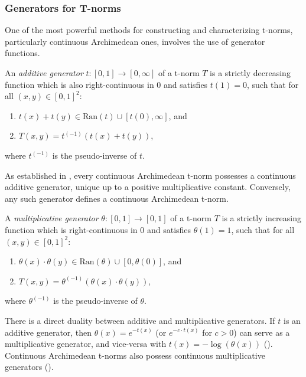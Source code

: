 \subsubsection{Generators for T-norms}

One of the most powerful methods for constructing and characterizing t-norms, particularly continuous Archimedean ones, involves the use of generator functions.

\begin{definition}
  An \emph{additive generator} $t: [0,1] \to [0,\infty]$ of a t-norm $T$ is a strictly decreasing function which is also right-continuous in $0$ and satisfies $t(1)=0$, such that for all $(x,y) \in [0,1]^2$:
  \begin{enumerate}
      \item $t(x) + t(y) \in \mathrm{Ran}(t) \cup [t(0), \infty]$, and
      \item $T(x,y) = t^{(-1)}(t(x) + t(y))$,
  \end{enumerate}
  where $t^{(-1)}$ is the pseudo-inverse of $t$.
\end{definition}

\begin{remark}
  As established in \cite[Theorem 5.1, p.~122]{Klement2000}, every continuous Archimedean t-norm possesses a continuous additive generator, unique up to a positive multiplicative constant. Conversely, any such generator defines a continuous Archimedean t-norm.
\end{remark}

\begin{definition}
  A \emph{multiplicative generator} $\theta: [0,1] \to [0,1]$ of a t-norm $T$ is a strictly increasing function which is right-continuous in $0$ and satisfies $\theta(1)=1$, such that for all $(x,y) \in [0,1]^2$:
  \begin{enumerate}
      \item $\theta(x) \cdot \theta(y) \in \mathrm{Ran}(\theta) \cup [0, \theta(0)]$, and
      \item $T(x,y) = \theta^{(-1)}(\theta(x) \cdot \theta(y))$,
  \end{enumerate}
  where $\theta^{(-1)}$ is the pseudo-inverse of $\theta$.
\end{definition}

\begin{remark}
  There is a direct duality between additive and multiplicative generators. If $t$ is an additive generator, then $\theta(x) = e^{-t(x)}$ (or $e^{-c \cdot t(x)}$ for $c>0$) can serve as a multiplicative generator, and vice-versa with $t(x) = -\log(\theta(x))$ (\cite[Remark 3.34, p.~90]{Klement2000}). Continuous Archimedean t-norms also possess continuous multiplicative generators (\cite[Corollary 5.4, p.~124]{Klement2000}).
\end{remark}

